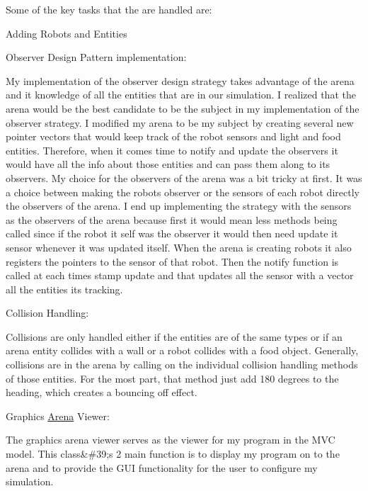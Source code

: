 Some of the key tasks that the are handled are\+:


\begin{DoxyItemize}
\item Adding Robots and Entities
\item Observer Design Pattern implementation\+:
\begin{DoxyItemize}
\item My implementation of the observer design strategy takes advantage of the arena and it knowledge of all the entities that are in our simulation. I realized that the arena would be the best candidate to be the subject in my implementation of the observer strategy. I modified my arena to be my subject by creating several new pointer vectors that would keep track of the robot sensors and light and food entities. Therefore, when it comes time to notify and update the observers it would have all the info about those entities and can pass them along to its observers. My choice for the observers of the arena was a bit tricky at first. It was a choice between making the robots observer or the sensors of each robot directly the observers of the arena. I end up implementing the strategy with the sensors as the observers of the arena because first it would mean less methods being called since if the robot it self was the observer it would then need update it sensor whenever it was updated itself. When the arena is creating robots it also registers the pointers to the sensor of that robot. Then the notify function is called at each times stamp update and that updates all the sensor with a vector all the entities its tracking.
\end{DoxyItemize}
\item Collision Handling\+:
\begin{DoxyItemize}
\item Collisions are only handled either if the entities are of the same types or if an arena entity collides with a wall or a robot collides with a food object. Generally, collisions are in the arena by calling on the individual collision handling methods of those entities. For the most part, that method just add 180 degrees to the heading, which creates a bouncing off effect.
\end{DoxyItemize}
\end{DoxyItemize}

Graphics \mbox{\hyperlink{class_arena}{Arena}} Viewer\+:

The graphics arena viewer serves as the viewer for my program in the M\+VC model. This class\&\#39;s 2 main function is to display my program on to the arena and to provide the G\+UI functionality for the user to configure my simulation.


